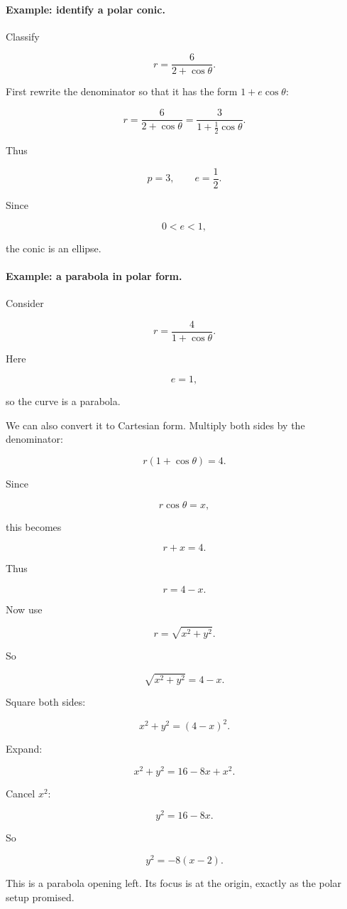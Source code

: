 \paragraph{Example: identify a polar conic.}
Classify

\[
r=\frac{6}{2+\cos\theta}.
\]

First rewrite the denominator so that it has the form \(1+e\cos\theta\):

\[
r
=
\frac{6}{2+\cos\theta}
=
\frac{3}{1+\frac12\cos\theta}.
\]

Thus

\[
p=3,
\qquad
e=\frac12.
\]

Since

\[
0<e<1,
\]

the conic is an ellipse.

\paragraph{Example: a parabola in polar form.}
Consider

\[
r=\frac{4}{1+\cos\theta}.
\]

Here

\[
e=1,
\]

so the curve is a parabola.

We can also convert it to Cartesian form.  Multiply both sides by the denominator:

\[
r(1+\cos\theta)=4.
\]

Since

\[
r\cos\theta=x,
\]

this becomes

\[
r+x=4.
\]

Thus

\[
r=4-x.
\]

Now use

\[
r=\sqrt{x^2+y^2}.
\]

So

\[
\sqrt{x^2+y^2}=4-x.
\]

Square both sides:

\[
x^2+y^2=(4-x)^2.
\]

Expand:

\[
x^2+y^2=16-8x+x^2.
\]

Cancel \(x^2\):

\[
y^2=16-8x.
\]

So

\[
\boxed{
y^2=-8(x-2).
}
\]

This is a parabola opening left.  Its focus is at the origin, exactly as the polar setup
promised.

